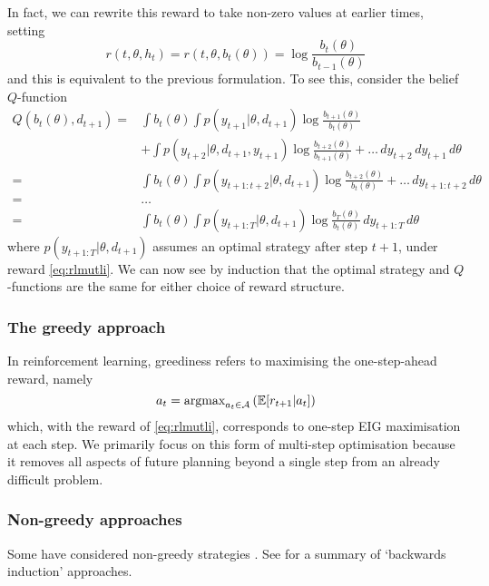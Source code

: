 In fact, we can rewrite this reward to take non-zero values at earlier times, setting
\begin{equation}
	\label{eq:rlmutli}
	r(t, \theta, h_t) = r(t, \theta, b_t(\theta)) = \log\frac{b_t(\theta)}{b_{t-1}(\theta)}
\end{equation}
and this is equivalent to the previous formulation. To see this, consider the belief $Q$-function
\begin{align}
	Q(b_t(\theta), d_{t+1}) =& \int b_t(\theta)  \int p(y_{t+1} | \theta, d_{t+1}) \log\frac{b_{t+1}(\theta)}{b_t(\theta)} \\ &+ \int p(y_{t+2} | \theta, d_{t+1}, y_{t+1}) \log \frac{b_{t+2}(\theta)}{b_{t+1}(\theta)} + \hdots \, dy_{t+2} \, dy_{t+1} \, d\theta \\
	=& \int b_t(\theta) \int p(y_{t+1:t+2}|\theta, d_{t+1}) \log \frac{b_{t+2}(\theta)}{b_t(\theta)} + \hdots \, dy_{t+1:t+2} \, d\theta \\
	=& \hdots \\
	=& \int b_t(\theta) \int p(y_{t+1:T}|\theta,d_{t+1}) \log \frac{b_T(\theta)}{b_t(\theta)} \, dy_{t+1:T} \, d\theta
\end{align}
where $p(y_{t+1:T}|\theta, d_{t+1})$ assumes an optimal strategy after step $t+1$, under reward \eqref{eq:rlmutli}. We can now see by induction that the optimal strategy and $Q$-functions are the same for either choice of reward structure.

\subsubsection{The greedy approach}
In reinforcement learning, greediness refers to maximising the one-step-ahead reward, namely
\begin{equation}
	a_t = \text{argmax}_{a_t \in \mathcal{A}} \left(\mathbb{E}[r_{t+1} | a_t] \right)
\end{equation}
which, with the reward of \eqref{eq:rlmutli}, corresponds to one-step EIG maximisation at each step. We primarily focus on this form of multi-step optimisation because it removes all aspects of future planning beyond a single step from an already difficult problem.

\subsubsection{Non-greedy approaches}
Some have considered non-greedy strategies \cite{gonzalez2016} \cite{pang2018}. See \cite[sec 6.1]{ryanreview} for a summary of `backwards induction' approaches.


